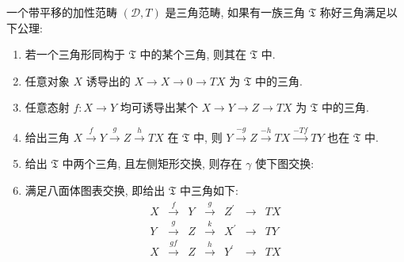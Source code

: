\begin{definition}[三角范畴]
    \label {definition:triangulated category}
    一个带平移的加性范畴 \((\mathcal{D},T)\) 是三角范畴, 如果有一族三角 \(\mathfrak{T}\) 称好三角满足以下公理:

    \begin{enumerate}
        \item 若一个三角形同构于 \(\mathfrak{T}\) 中的某个三角, 则其在 \(\mathfrak{T}\) 中.
        \item 任意对象 \(X\) 诱导出的 \(X \to X \to 0 \to T X\) 为 \(\mathfrak{T}\) 中的三角.
        \item 任意态射 \(f : X \to Y\) 均可诱导出某个 \(X \to Y \to Z \to T X\) 为 \(\mathfrak{T}\) 中的三角.
        \item 给出三角 \(X \xrightarrow{f} Y \xrightarrow{g} Z \xrightarrow{h} T X\) 在 \(\mathfrak{T}\) 中, 则 \(Y \xrightarrow{-g} Z \xrightarrow{-h} T X \xrightarrow{-T f} T Y\) 也在 \(\mathfrak{T}\) 中.
        \item 给出 \(\mathfrak{T}\) 中两个三角, 且左侧矩形交换, 则存在 \(\gamma\) 使下图交换:
            \begin{center}
            \end{center}
        \item 满足八面体图表交换, 即给出 \(\mathfrak{T}\) 中三角如下:
            \[
                \begin{aligned}
                    X & \xrightarrow{f} & Y & \xrightarrow{g} & Z^\prime & \to & T X \\
                    Y & \xrightarrow{g} & Z & \xrightarrow{k} & X^\prime & \to & T Y \\
                    X & \xrightarrow{gf} & Z & \xrightarrow{h} & Y^\prime & \to & T X
                \end{aligned}
            \]


\end{enumerate}
\end{definition}

